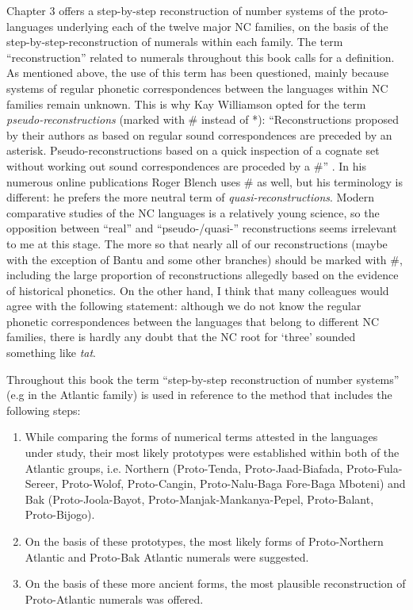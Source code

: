 Chapter 3 offers a step-by-step reconstruction of number systems of the proto-languages underlying each of the twelve major NC families, on the basis of the step-by-step-reconstruction of numerals within each family. The term “reconstruction” related to numerals throughout this book calls for a definition.  As mentioned above, the use of this term has been questioned, mainly because systems of regular phonetic correspondences between the languages within NC families remain unknown. This is why Kay Williamson opted for the term \textit{pseudo-reconstructions} (marked with \# instead of *): “Reconstructions proposed by their authors as based on regular sound correspondences are preceded by an asterisk. Pseudo-reconstructions based on a quick inspection of a cognate set without working out sound correspondences are proceded by a \#” \citep[251]{Williamson1989b}. In his numerous online publications Roger Blench uses \# as well, but his terminology is different: he prefers the more neutral term of \textit{quasi-reconstructions}. Modern comparative studies of the NC languages is a relatively young science, so the opposition between “real” and “pseudo-/quasi-” reconstructions seems irrelevant to me at this stage. The more so that nearly all of our reconstructions (maybe with the exception of Bantu and some other branches) should be marked with \#, including the large proportion of reconstructions allegedly based on the evidence of historical phonetics. On the other hand, I think that many colleagues would agree with the following statement: although we do not know the regular phonetic correspondences between the languages that belong to different NC families, there is hardly any doubt that the NC root for ‘three’ sounded something like \textit{tat}.

Throughout this book the term “step-by-step reconstruction of number systems” (e.g in the Atlantic family) is used in reference to the method that includes the following steps:

\begin{enumerate}
\item While comparing the forms of numerical terms attested in the languages under study, their most likely prototypes were established within both of the Atlantic groups, i.e. Northern (Proto-Tenda, Proto-Jaad-Biafada, Proto-Fula-Sereer, Proto-Wolof, Proto-Cangin, Proto-Nalu-Baga Fore-Baga Mboteni) and Bak (Proto-Joola-Bayot, Proto-Manjak-Mankanya-Pepel, Proto-Balant, Proto-Bijogo).
\item On the basis of these prototypes, the most likely forms of Proto-Northern Atlantic and Proto-Bak Atlantic numerals were suggested.
\item On the basis of these more ancient forms, the most plausible reconstruction of Proto-Atlantic numerals was offered.
\end{enumerate}

